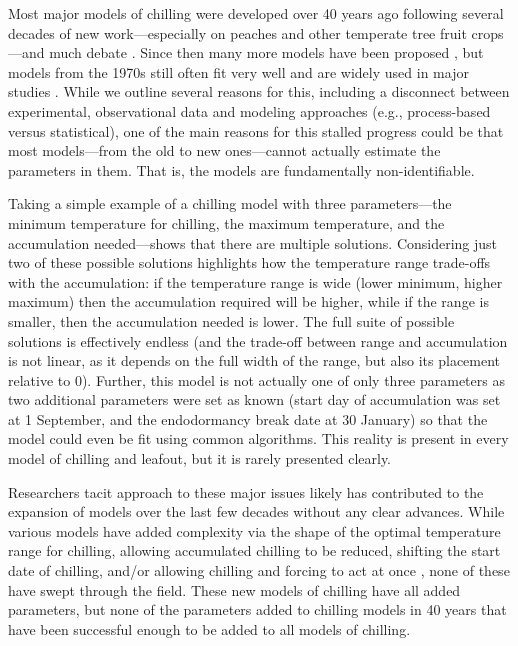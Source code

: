 \documentclass[11pt]{article}
\begin{document}
Most major models of chilling were developed over 40 years ago \citep{richardson1974,chuine2016} following several decades of new work---especially on peaches and other temperate tree fruit crops---and much debate \citep{dormtreeproc}. Since then many more models have been proposed \citep{luedeling2012chilling,chuine2016}, but models from the 1970s still often fit very well \citep{basler2016evaluating,chuine2016} and are widely used in major studies \citep[e.g.,][]{richardson1974,chuine2016,ospreebbms}. While we outline several reasons for this, including a disconnect between experimental, observational data and modeling approaches (e.g., process-based versus statistical), one of the main reasons for this stalled progress could be that most models---from the old to new ones---cannot actually estimate the parameters in them. That is, the models are fundamentally non-identifiable.

Taking a simple example of a chilling model with three parameters---the minimum temperature for chilling, the maximum temperature, and the accumulation needed---shows that there are multiple solutions. Considering just two of these possible solutions highlights how the temperature range trade-offs with the accumulation: if the temperature range is wide (lower minimum, higher maximum) then the accumulation required will be higher, while if the range is smaller, then the accumulation needed is lower. The full suite of possible solutions is effectively endless (and the trade-off between range and accumulation is not linear, as it depends on the full width of the range, but also its placement relative to 0). Further, this model is not actually one of only three parameters as two additional parameters were set as known (start day of accumulation was set at 1 September, and the endodormancy break date at 30 January) so that the model could even be fit using common algorithms. %
This reality is present in every model of chilling and leafout, but it is rarely presented clearly. %

Researchers tacit approach to these major issues likely has contributed to the expansion of models over the last few decades without any clear advances. While various models have added complexity via the shape of the optimal temperature range for chilling, allowing accumulated chilling to be reduced, shifting the start date of chilling, and/or allowing chilling and forcing to act at once \citep{lued2009,gusewell2017,hanninen1990modelling,Kramer1994}, none of these have swept through the field. These new models of chilling have all added parameters, but none of the parameters added to chilling models in 40 years that have been successful enough to be added to all models of chilling. 
\end{document}
